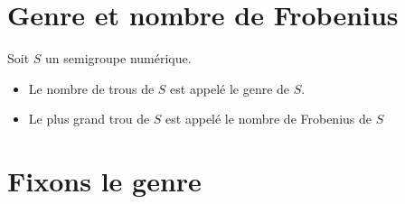 \section{Genre et nombre de Frobenius}
 \begin{definition}
   Soit $S$ un semigroupe numérique.
   \begin{itemize}
     \item Le nombre de trous de $S$ est appelé le genre de $S$.
     \item Le plus grand trou de $S$ est appelé le nombre de Frobenius de $S$
   \end{itemize}
 \end{definition}
\section{Fixons le genre}